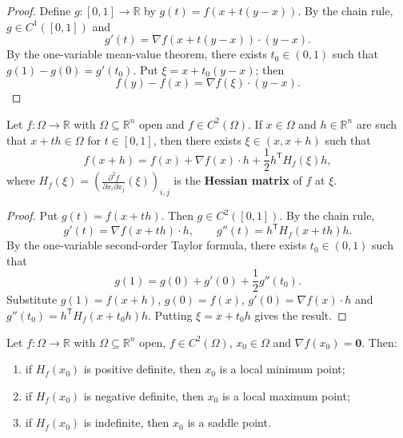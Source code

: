 \begin{proof}
Define $g: [0, 1] \to \mathbb{R}$ by $g(t) = f(x + t(y - x))$. By the chain rule, $g \in C^1([0, 1])$ and
\[
g'(t) = \nabla f(x + t(y - x)) \cdot (y - x).
\]
By the one-variable mean-value theorem, there exists $t_0 \in (0, 1)$ such that $g(1) - g(0) = g'(t_0)$. Put $\xi = x + t_0(y - x)$; then
\[
f(y) - f(x) = \nabla f(\xi) \cdot (y - x).
\]
\end{proof}

\begin{theorem}\label{thm:taylor_second_order}
Let $f: \Omega \to \mathbb{R}$ with $\Omega \subseteq \mathbb{R}^n$ open and $f \in C^2(\Omega)$. If $x \in \Omega$ and $h \in \mathbb{R}^n$ are such that $x + t h \in \Omega$ for $t \in [0, 1]$, then there exists $\xi \in (x, x + h)$ such that
\[
f(x + h) = f(x) + \nabla f(x) \cdot h + \frac{1}{2} h^{\mathsf T} H_f(\xi) h,
\]
where $H_f(\xi) = \left( \frac{\partial^2 f}{\partial x_i \partial x_j}(\xi) \right)_{i,j}$ is the \textbf{Hessian matrix} of $f$ at $\xi$.
\end{theorem}

\begin{proof}
Put $g(t) = f(x + t h)$. Then $g \in C^2([0, 1])$. By the chain rule,
\[
g'(t) = \nabla f(x + t h) \cdot h, \qquad g''(t) = h^{\mathsf T} H_f(x + t h) h.
\]
By the one-variable second-order Taylor formula, there exists $t_0 \in (0, 1)$ such that
\[
g(1) = g(0) + g'(0) + \frac{1}{2} g''(t_0).
\]
Substitute $g(1) = f(x + h)$, $g(0) = f(x)$, $g'(0) = \nabla f(x) \cdot h$ and $g''(t_0) = h^{\mathsf T} H_f(x + t_0 h) h$. Putting $\xi = x + t_0 h$ gives the result.
\end{proof}

\begin{corollary}\label{cor:extremum_second_order}
Let $f: \Omega \to \mathbb{R}$ with $\Omega \subseteq \mathbb{R}^n$ open, $f \in C^2(\Omega)$, $x_0 \in \Omega$ and $\nabla f(x_0) = \mathbf{0}$. Then:
\begin{enumerate}[label=(\roman*)]
    \item if $H_f(x_0)$ is positive definite, then $x_0$ is a local minimum point;
    \item if $H_f(x_0)$ is negative definite, then $x_0$ is a local maximum point;
    \item if $H_f(x_0)$ is indefinite, then $x_0$ is a saddle point.
\end{enumerate}
\end{corollary}

